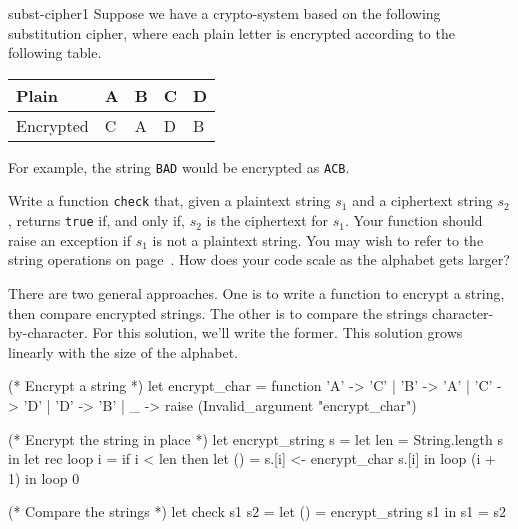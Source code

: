 %
\begin{exercise}{subst-cipher1}
Suppose we have a crypto-system based on the following substitution cipher,
where each plain letter is encrypted according to the following table.

\begin{center}
\begin{tabular}{l|llll}
Plain     & A & B & C & D\\
\hline
Encrypted & C & A & D & B
\end{tabular}
\end{center}
%
For example, the string \hbox{\lstinline/BAD/} would be encrypted as \hbox{\lstinline/ACB/}.

Write a function \hbox{\lstinline/check/} that, given a plaintext string $s_1$ and a ciphertext string
$s_2$, returns \hbox{\lstinline/true/} if, and only if, $s_2$ is the ciphertext for $s_1$.  Your function
should raise an exception if $s_1$ is not a plaintext string.  You may wish to refer to the string
operations on page~\pageref{section:ocaml-doc-expr-string}.  How does your code scale as the alphabet gets
larger?

\begin{answer}\ifanswers
There are two general approaches.  One is to write a function to encrypt a string, then compare
encrypted strings.  The other is to compare the strings character-by-character.
For this solution, we'll write the former.  This solution grows linearly with the size of
the alphabet.

\begin{ocaml}
(* Encrypt a string *)
let encrypt_char = function
   'A' -> 'C'
 | 'B' -> 'A'
 | 'C' -> 'D'
 | 'D' -> 'B'
 | _ -> raise (Invalid_argument "encrypt_char")

(* Encrypt the string in place *)
let encrypt_string s =
   let len = String.length s in
   let rec loop i =
      if i < len then
         let () = s.[i] <- encrypt_char s.[i] in
         loop (i + 1)
   in
   loop 0

(* Compare the strings *)
let check s1 s2 =
   let () = encrypt_string s1 in
   s1 = s2
\end{ocaml}
\fi\end{answer}
\end{exercise}

